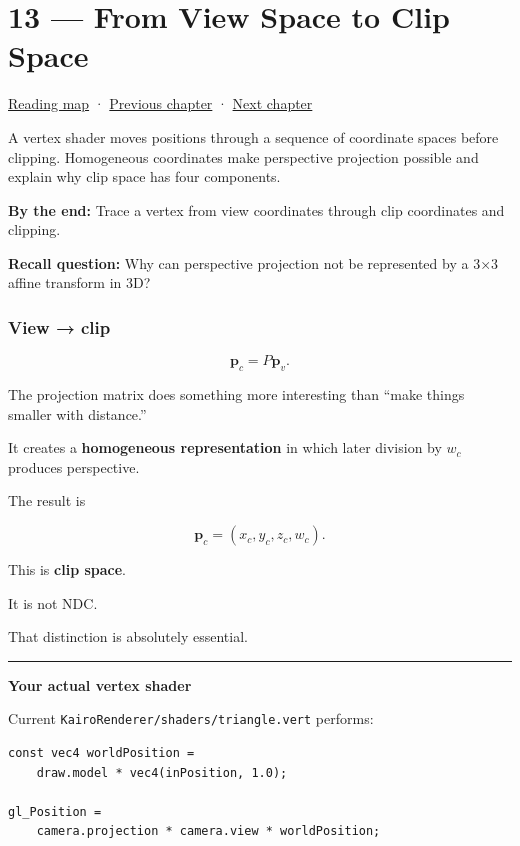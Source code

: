 \hypertarget{03-visual-computing-i-ch013}{}
\chapter{13 --- From View Space to Clip Space}\label{03-visual-computing-i-ch013-from-view-space-to-clip-space}

\hyperref[volume-reading-map]{Reading map} · \hyperref[03-visual-computing-i-ch012-probability-statistics-and-uncertainty]{Previous chapter} · \hyperref[03-visual-computing-i-ch014-transparency-blending-and-visibility]{Next chapter}

A vertex shader moves positions through a sequence of coordinate spaces before clipping. Homogeneous coordinates make perspective projection possible and explain why clip space has four components.

\textbf{By the end:} Trace a vertex from view coordinates through clip coordinates and clipping.

\textbf{Recall question:} Why can perspective projection not be represented by a 3×3 affine transform in 3D?

\subsection{View → clip}\label{03-visual-computing-i-ch013-view-clip}

\[
\mathbf p_c=P\mathbf p_v.
\]

The projection matrix does something more interesting than ``make things smaller with distance.''

It creates a \textbf{homogeneous representation} in which later division by \(w_c\) produces perspective.

The result is

\[
\mathbf p_c=
(x_c,y_c,z_c,w_c).
\]

This is \textbf{clip space}.

It is not NDC.

That distinction is absolutely essential.

\begin{center}\rule{0.5\linewidth}{0.5pt}\end{center}

\textbf{Your actual vertex shader}

Current \texttt{KairoRenderer/shaders/triangle.vert} performs:

\begin{verbatim}
const vec4 worldPosition =
    draw.model * vec4(inPosition, 1.0);

gl_Position =
    camera.projection * camera.view * worldPosition;
\end{verbatim}

